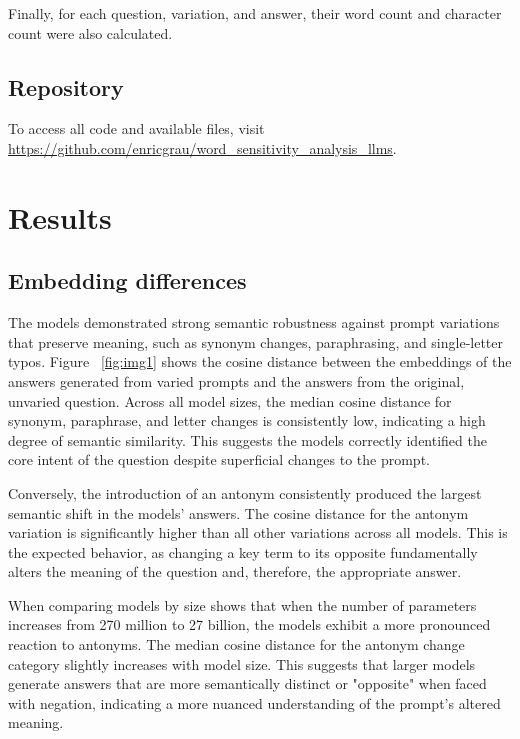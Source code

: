 \documentclass[a4paper,
               ]{jacow}
\begin{document}
Finally, for each question, variation, and answer, their word count and character count were also calculated.

\subsection{Repository}
To access all code and available files, visit \url{https://github.com/enricgrau/word_sensitivity_analysis_llms}.

\section{Results}

\subsection{Embedding differences}
The models demonstrated strong semantic robustness against prompt variations that preserve meaning, such as synonym changes, paraphrasing, and single-letter typos. Figure ~\ref{fig:img1} shows the cosine distance between the embeddings of the answers generated from varied prompts and the answers from the original, unvaried question. Across all model sizes, the median cosine distance for synonym, paraphrase, and letter changes is consistently low, indicating a high degree of semantic similarity. This suggests the models correctly identified the core intent of the question despite superficial changes to the prompt.

Conversely, the introduction of an antonym consistently produced the largest semantic shift in the models' answers. The cosine distance for the antonym variation is significantly higher than all other variations across all models. This is the expected behavior, as changing a key term to its opposite fundamentally alters the meaning of the question and, therefore, the appropriate answer.

When comparing models by size shows that when the number of parameters increases from 270 million to 27 billion, the models exhibit a more pronounced reaction to antonyms. The median cosine distance for the antonym change category slightly increases with model size. This suggests that larger models generate answers that are more semantically distinct or "opposite" when faced with negation, indicating a more nuanced understanding of the prompt's altered meaning.
\end{document}
